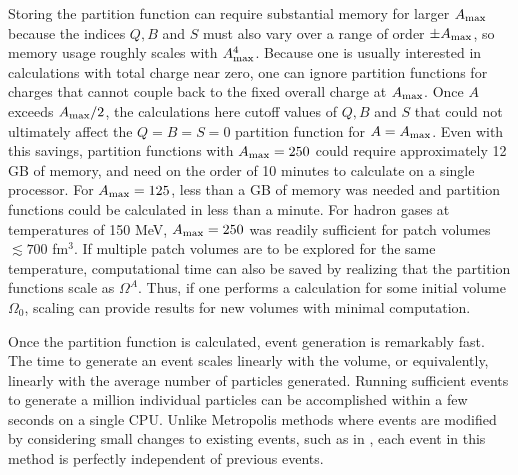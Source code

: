 Storing the partition function can require substantial memory for larger $A_{\rm max}$ because the indices $Q,B$ and $S$ must also vary over a range of order $\pm A_{\rm max}$, so memory usage roughly scales with $A_{\rm max}^4$. Because one is usually interested in calculations with total charge near zero, one can ignore partition functions for charges that cannot couple back to the fixed overall charge at $A_{\rm max}$. Once $A$ exceeds $A_{\rm max}/2$, the calculations here cutoff values of $Q,B$ and $S$ that could not ultimately affect the $Q=B=S=0$ partition function for $A=A_{\rm max}$. Even with this savings, partition functions with $A_{\rm max}=250$ could require approximately 12 GB of memory, and need on the order of 10 minutes to calculate on a single processor. For $A_{\rm max}=125$, less than a GB of memory was needed and partition functions could be calculated in less than a minute. For hadron gases at temperatures of 150 MeV, $A_{\rm max}=250$ was readily sufficient for patch volumes $\lesssim 700$ fm$^3$. If multiple patch volumes are to be explored for the same temperature, computational time can also be saved by realizing that the partition functions scale as $\Omega^A$. Thus, if one performs a calculation for some initial volume $\Omega_0$, scaling can provide results for new volumes with minimal computation.

Once the partition function is calculated, event generation is remarkably fast. The time to generate an event scales linearly with the volume, or equivalently, linearly with the average number of particles generated. Running sufficient events to generate a million individual particles can be accomplished within a few seconds on a single CPU. Unlike Metropolis methods where events are modified by considering small changes to existing events, such as in \cite{Oliinychenko:2020cmr}, each event in this method is perfectly independent of previous events.
